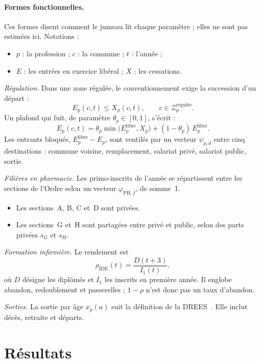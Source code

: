 \documentclass[11pt]{article}
\begin{document}
\paragraph{Formes fonctionnelles.}
Ces formes disent comment le jumeau lit chaque paramètre ; elles ne sont pas
estimées ici. Notations :
\begin{itemize}
\item $p$ : la profession ; $c$ : la commune ; $t$ : l'année ;
\item $E$ : les entrées en exercice libéral ; $X$ : les cessations.
\end{itemize}

\emph{Régulation.} Dans une zone régulée, le conventionnement exige la
succession d'un départ :
\begin{equation}
E_p(c,t) \le X_p(c,t), \qquad c \in \mathcal{Z}_p^{\text{régulée}}.
\end{equation}
Un plafond qui fuit, de paramètre $\theta_p \in [0,1]$, s'écrit :
\begin{equation}
E_p(c,t) = \theta_p \min\bigl(E^{\text{libre}}_p, X_p\bigr) + (1-\theta_p)\,E^{\text{libre}}_p .
\end{equation}
Les entrants bloqués, $E^{\text{libre}}_p - E_p$, sont ventilés par un
vecteur $\psi_{p,d}$ entre cinq destinations : commune voisine,
remplacement, salariat privé, salariat public, sortie.

\emph{Filières en pharmacie.} Les primo-inscrits de l'année se répartissent
entre les sections de l'Ordre selon un vecteur $\varphi_{\mathrm{PH},f}$,
de somme~1.
\begin{itemize}
\item Les sections~A, B, C et~D sont privées.
\item Les sections~G et~H sont partagées entre privé et public, selon des
  parts privées $s_G$ et $s_H$.
\end{itemize}

\emph{Formation infirmière.} Le rendement est
\begin{equation}
\rho_{\mathrm{IDE}}(t) = \frac{D(t+3)}{I_1(t)},
\end{equation}
où $D$ désigne les diplômés et $I_1$ les inscrits en première année. Il
englobe abandon, redoublement et passerelles ; $1-\rho$ n'est donc pas un
taux d'abandon.

\emph{Sorties.} La sortie par âge $x_p(a)$ suit la définition de la
DREES~\cite{dd76}. Elle inclut décès, retraite et départs.

\section{Résultats}
\end{document}
